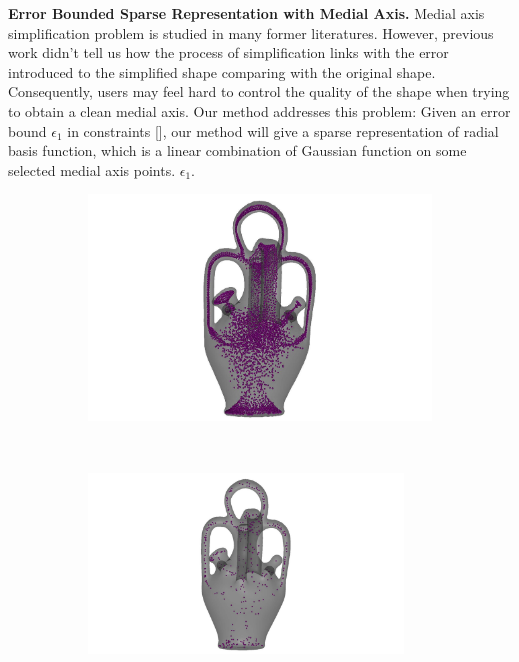\documentclass[annual]{acmsiggraph}
\begin{document}
\textbf{Error Bounded Sparse Representation with Medial Axis. }
Medial axis simplification problem is studied in many former literatures. However, previous work didn't tell us how the process of simplification links with the error introduced to the simplified shape comparing with the original shape. Consequently, users may feel hard to control the quality of the shape when trying to obtain a clean medial axis. Our method addresses this problem: Given an error bound $\epsilon_1$ in constraints [], our method will give a sparse representation of radial basis function, which is a linear combination of Gaussian function on some selected medial axis points. $\epsilon_1$. 
\begin{figure}
        \centering
		\begin{subfigure}[b]{0.24\linewidth}
                \centering
                \includegraphics[width=\textwidth]{images/vase/0.pdf}
       \end{subfigure}
		~
		\begin{subfigure}[b]{0.24\linewidth}
                \centering
                \includegraphics[width=0.92\textwidth]{images/vase/2.pdf}

\end{subfigure}
\end{figure}
\end{document}
